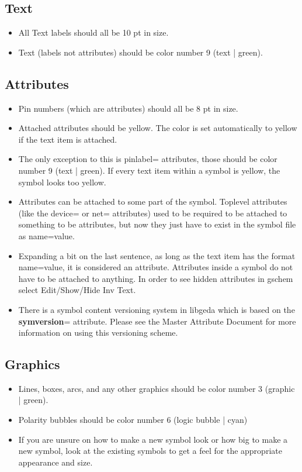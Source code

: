 \documentclass{article}
\begin{document}
\subsection{Text}

\begin{itemize}
\item All Text labels should all be 10 pt in size.
\item Text (labels not attributes) should be color number 9 (text | green).
\end{itemize}

\subsection{Attributes}
\begin{itemize}
\item Pin numbers (which are attributes) should all be 8 pt in size.
\item Attached attributes should be yellow.  The color is set
      automatically to yellow if the text item is attached.
\item The only exception to this is pinlabel= attributes, those should be
      color number 9 (text | green).  If every text item within a symbol is
      yellow, the symbol looks too yellow.
\item Attributes can be attached to some part of the symbol.
      Toplevel attributes (like the device= or net= attributes) used to
      be required to be attached to something to be attributes, but now
      they just have to exist in the symbol file as name=value.
\item Expanding a bit on the last sentence, as long as the text item
      has the format name=value, it is considered an attribute.
      Attributes inside a symbol do not have to be attached to anything.
      In order to see hidden attributes in gschem select Edit/Show/Hide Inv
      Text.
\item There is a symbol content versioning system in libgeda which is
      based on the {\bf symversion}= attribute.  Please see the Master
      Attribute Document for more information on using this versioning 
      scheme.


\end{itemize}

\subsection{Graphics}

\begin{itemize}
\item Lines, boxes, arcs, and any other graphics should be color number 3 
      (graphic | green).
\item Polarity bubbles should be color number 6 (logic bubble | cyan) 
\item If you are unsure on how to make a new symbol look or how big to
      make a new symbol, look at the existing symbols to get a feel for
      the appropriate appearance and size.
\end{itemize}
\end{document}
